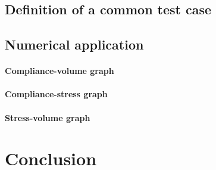 \subsection{Definition of a common test case}

\subsection{Numerical application}

\paragraph{Compliance-volume graph}

\paragraph{Compliance-stress graph}

\paragraph{Stress-volume graph}

\section{Conclusion}
